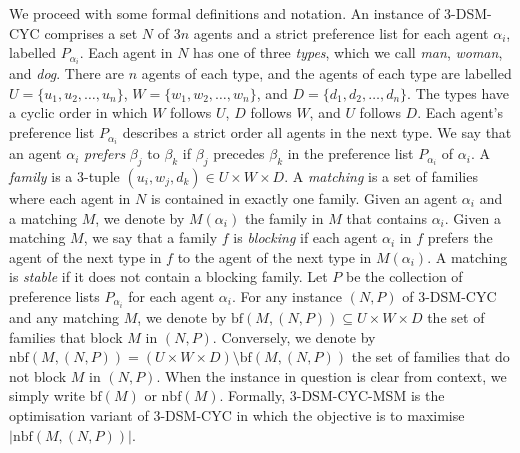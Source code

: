We proceed with some formal definitions and notation. An instance of 3-DSM-CYC comprises a set $N$ of $3n$ agents and a strict preference list for each agent $\alpha_i$, labelled $P_{\alpha_i}$. Each agent in $N$ has one of three \emph{types}, which we call \emph{man}, \emph{woman}, and \emph{dog}. There are $n$ agents of each type, and the agents of each type are labelled $U = \{ u_1, u_2, \dots, u_n \}$, $W = \{ w_1, w_2, \dots, w_n \}$, and $D =  \{ d_1, d_2, \dots, d_n \}$. The types have a cyclic order in which $W$ follows $U$, $D$ follows $W$, and $U$ follows $D$. Each agent's preference list $P_{\alpha_i}$ describes a strict order all agents in the next type. We say that an agent $\alpha_i$ \textit{prefers} $\beta_j$ to $\beta_k$ if $\beta_j$ precedes $\beta_k$ in the preference list $P_{\alpha_i}$ of $\alpha_i$. A \textit{family} is a $3$-tuple $( u_i, w_j, d_k ) \in U\times W\times D$. A \textit{matching} is a set of families where each agent in $N$ is contained in exactly one family. Given an agent $\alpha_i$ and a matching $M$, we denote by $M(\alpha_i)$ the family in $M$ that contains $\alpha_i$. Given a matching $M$, we say that a family $f$ is \textit{blocking} if each agent $\alpha_i$ in $f$ prefers the agent of the next type in $f$ to the agent of the next type in $M(\alpha_i)$. A matching is \textit{stable} if it does not contain a blocking family. Let $P$ be the collection of preference lists  $P_{\alpha_i}$ for each agent $\alpha_i$. For any instance $(N, P)$ of 3-DSM-CYC and any matching $M$, we denote by $\textrm{bf}(M, (N, P)) \subseteq U \times W \times D$ the set of families that block $M$ in $(N, P)$. Conversely, we denote by $\textrm{nbf}(M, (N, P)) = (U \times W\times D) \setminus \textrm{bf}(M, (N, P))$ the set of families that do not block $M$ in $(N, P)$. When the instance in question is clear from context, we simply write $\textrm{bf}(M)$ or $\textrm{nbf}(M)$. Formally, 3-DSM-CYC-MSM is the optimisation variant of 3-DSM-CYC in which the objective is to maximise $|\textrm{nbf}(M, (N, P))|$.



